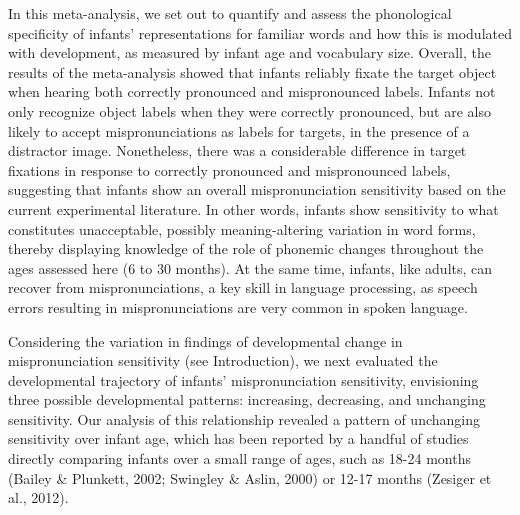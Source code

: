 \documentclass[man]{apa6}
\begin{document}
In this meta-analysis, we set out to quantify and assess the phonological specificity of infants' representations for familiar words and how this is modulated with development, as measured by infant age and vocabulary size. Overall, the results of the meta-analysis showed that infants reliably fixate the target object when hearing both correctly pronounced and mispronounced labels. Infants not only recognize object labels when they were correctly pronounced, but are also likely to accept mispronunciations as labels for targets, in the presence of a distractor image. Nonetheless, there was a considerable difference in target fixations in response to correctly pronounced and mispronounced labels, suggesting that infants show an overall mispronunciation sensitivity based on the current experimental literature. In other words, infants show sensitivity to what constitutes unacceptable, possibly meaning-altering variation in word forms, thereby displaying knowledge of the role of phonemic changes throughout the ages assessed here (6 to 30 months). At the same time, infants, like adults, can recover from mispronunciations, a key skill in language processing, as speech errors resulting in mispronunciations are very common in spoken language.

Considering the variation in findings of developmental change in mispronunciation sensitivity (see Introduction), we next evaluated the developmental trajectory of infants' mispronunciation sensitivity, envisioning three possible developmental patterns: increasing, decreasing, and unchanging sensitivity. Our analysis of this relationship revealed a pattern of unchanging sensitivity over infant age, which has been reported by a handful of studies directly comparing infants over a small range of ages, such as 18-24 months (Bailey \& Plunkett, 2002; Swingley \& Aslin, 2000) or 12-17 months (Zesiger et al., 2012).
\end{document}
